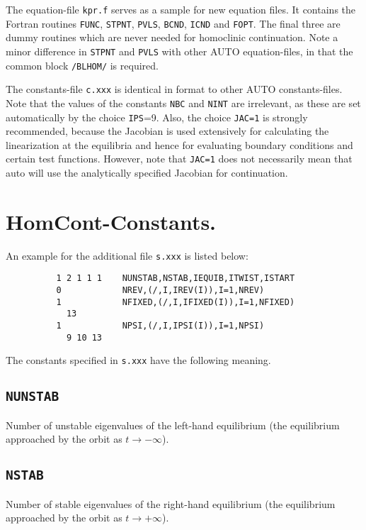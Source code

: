 \documentclass[12pt]{report}
\begin{document}
The equation-file {\tt kpr.f} serves as a sample for new equation
files. It contains the Fortran routines 
{\tt FUNC}, {\tt STPNT}, {\tt PVLS}, {\tt BCND}, {\tt ICND} 
and {\tt FOPT}. The final three are
dummy routines which are never needed for homoclinic continuation.
Note a minor difference in {\tt STPNT} and {\tt PVLS} with other 
{\cal AUTO} equation-files, in that the common block 
{\tt /BLHOM/} is required.

The constants-file {\tt c.xxx} is identical in format to other
{\cal AUTO} constants-files. Note that the values of the constants
{\tt NBC} and {\tt NINT} are irrelevant, as these are set
automatically by the choice {\tt IPS}=9. Also, the choice {\tt JAC=1}
is strongly recommended, because the Jacobian is used extensively for
calculating the linearization at the equilibria and hence for
evaluating boundary conditions and certain test functions. However,
note that {\tt JAC=1} does not necessarily mean that {\cal auto} will
use the analytically specified Jacobian for continuation.

\section{ {\cal HomCont}-Constants.} \label{sec:HomCont_Constants}
An example for the additional file {\tt s.xxx} is listed below:
\begin{verbatim}
          1 2 1 1 1    NUNSTAB,NSTAB,IEQUIB,ITWIST,ISTART
          0            NREV,(/,I,IREV(I)),I=1,NREV)
          1            NFIXED,(/,I,IFIXED(I)),I=1,NFIXED)
            13
          1            NPSI,(/,I,IPSI(I)),I=1,NPSI)
            9 10 13
\end{verbatim}
The constants specified in {\tt s.xxx} have the following meaning. 

\subsection{\tt NUNSTAB}  \label{sec:NUNSTAB}

Number of unstable eigenvalues of the left-hand equilibrium (the equilibrium 
approached by the orbit as $t \to -\infty$).


\subsection{\tt NSTAB}  \label{sec:NSTAB}
Number of stable eigenvalues of the right-hand equilibrium (the equilibrium
approached by the orbit as $t \to +\infty$).
\end{document}
